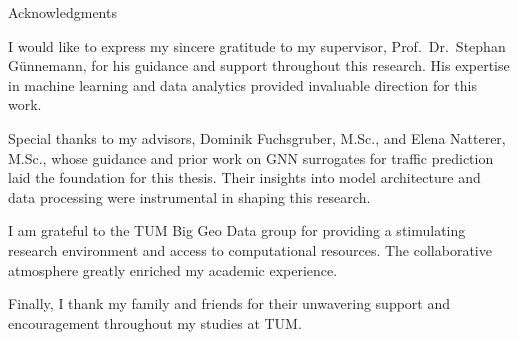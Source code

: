 \thispagestyle{empty}

\vspace*{20mm}

\begin{center}
    { Acknowledgments}
\end{center}

\vspace{10mm}

I would like to express my sincere gratitude to my supervisor, Prof.~Dr.~Stephan Günnemann, for his guidance and support throughout this research. His expertise in machine learning and data analytics provided invaluable direction for this work.

Special thanks to my advisors, Dominik Fuchsgruber, M.Sc., and Elena Natterer, M.Sc., whose guidance and prior work on GNN surrogates for traffic prediction laid the foundation for this thesis. Their insights into model architecture and data processing were instrumental in shaping this research.

I am grateful to the TUM Big Geo Data group for providing a stimulating research environment and access to computational resources. The collaborative atmosphere greatly enriched my academic experience.

Finally, I thank my family and friends for their unwavering support and encouragement throughout my studies at TUM.

\clearpage{}
